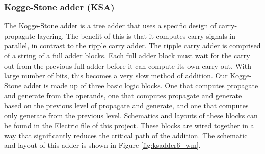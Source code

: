 \documentclass[conference]{IEEEtran}
\begin{document}
\subsubsection{Kogge-Stone adder (KSA)}
The Kogge-Stone adder is a tree adder that uses a specific design of carry-propagate layering. The benefit of this is that it computes carry signals in parallel, in contrast to the ripple carry adder. The ripple carry adder is comprised of a string of a full adder blocks. Each full adder block must wait for the carry out from the previous full adder before it can compute its own carry out. With large number of bits, this becomes a very slow method of addition. Our Kogge-Stone adder is made up of three basic logic blocks. One that computes propagate and generate from the operands, one that computes propagate and generate based on the previous level of propagate and generate, and one that computes only generate from the previous level. Schematics and layouts of these blocks can be found in the Electric file of this project. These blocks are wired together in a way that significantly reduces the critical path of the addition. The schematic and layout of this adder is shown in Figure \ref{fig:ksadder6_wm}.
\end{document}
